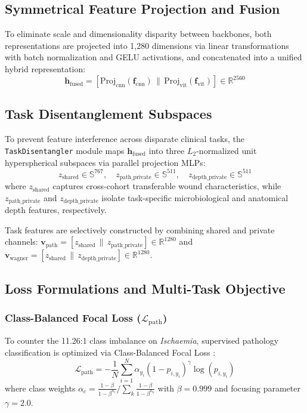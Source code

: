 \documentclass[journal]{IEEEtran}
\begin{document}
\subsection{Symmetrical Feature Projection and Fusion}
To eliminate scale and dimensionality disparity between backbones, both representations are projected into 1,280 dimensions via linear transformations with batch normalization and GELU activations, and concatenated into a unified hybrid representation:
\begin{equation}
    \mathbf{h}_{\text{fused}} = [\text{Proj}_{\text{cnn}}(\mathbf{f}_{\text{cnn}}) \,\|\, \text{Proj}_{\text{vit}}(\mathbf{f}_{\text{vit}})] \in \mathbb{R}^{2560}
\end{equation}

\subsection{Task Disentanglement Subspaces}
To prevent feature interference across disparate clinical tasks, the \texttt{TaskDisentangler} module maps $\mathbf{h}_{\text{fused}}$ into three $L_2$-normalized unit hyperspherical subspaces via parallel projection MLPs:
\begin{equation}
    z_{\text{shared}} \in \mathbb{S}^{767}, \quad z_{\text{path\_private}} \in \mathbb{S}^{511}, \quad z_{\text{depth\_private}} \in \mathbb{S}^{511}
\end{equation}
where $z_{\text{shared}}$ captures cross-cohort transferable wound characteristics, while $z_{\text{path\_private}}$ and $z_{\text{depth\_private}}$ isolate task-specific microbiological and anatomical depth features, respectively.

Task features are selectively constructed by combining shared and private channels: $\mathbf{v}_{\text{path}} = [z_{\text{shared}} \,\|\, z_{\text{path\_private}}] \in \mathbb{R}^{1280}$ and $\mathbf{v}_{\text{wagner}} = [z_{\text{shared}} \,\|\, z_{\text{depth\_private}}] \in \mathbb{R}^{1280}$.

\subsection{Loss Formulations and Multi-Task Objective}

\subsubsection{Class-Balanced Focal Loss ($\mathcal{L}_{\text{path}}$)}
To counter the 11.26:1 class imbalance on \textit{Ischaemia}, supervised pathology classification is optimized via Class-Balanced Focal Loss \cite{cui2019class}:
\begin{equation}
    \mathcal{L}_{\text{path}} = -\frac{1}{N} \sum_{i=1}^N \alpha_{y_i} \left(1 - p_{i, y_i}\right)^\gamma \log\left(p_{i, y_i}\right)
\end{equation}
where class weights $\alpha_c = \frac{1 - \beta}{1 - \beta^{n_c}} / \sum_{k} \frac{1 - \beta}{1 - \beta^{n_k}}$ with $\beta = 0.999$ and focusing parameter $\gamma = 2.0$.
\end{document}
